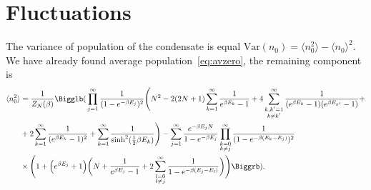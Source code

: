 \documentclass[aps,pra,reprint]{revtex4-2}
\begin{document}
\section{Fluctuations}
The variance of population of the condensate is equal 
$\text{Var}(n_0)=\langle n_0^2 \rangle -\langle n_0 \rangle ^2$. We have 
already found average population~\eqref{eq:avzero}, the remaining component is
\begin{equation}
\begin{split}
\langle n_0 ^2 \rangle &= \frac{1}{Z_N(\beta)} \Bigglb ( \,\prod_{j=1}^{\infty} 
\frac{1}{(1-e^{-\beta E_j})^2} \Bigg(N^2 - 2 (2N+1)\sum_{k=1}^{\infty} 
\frac{1}{e^{\beta E_k}-1} + 4\sum_{\substack{k,k'=1 \\k \neq k'}}^{\infty} 
\frac{1}{(e^{\beta E_k}-1)(e^{\beta E_{k'}}-1)} + \\ 
& + 2\sum_{k=1}^{\infty} \frac{1}{(e^{\beta E_k}-1)^2} + 
\sum_{k=1}^{\infty} \frac{1}{\text{sinh}^2(\frac{1}{2} \beta E_k)} \Bigg) - 
\sum_{j=1}^{\infty} \frac{e^{-\beta E_j N}}{1-e^{-\beta E_j}} 
\prod_{\substack{k=0 \\ k \neq j}}^{\infty} \frac{1}{(1-e^{-\beta(E_k-E_j)})^2} 
\\ 
& \times \Bigg(1 + \Big(e^{\beta E_j}+1\Big) \bigg(N + 
\frac{1}{e^{\beta E_j}-1} + 2\sum_{\substack{l=0 \\ l \neq j}}^{\infty} 
\frac{1}{1-e^{-\beta(E_j-E_l)}} \bigg) \Bigg) \Biggrb ).
\end{split}
\end{equation}

\twocolumngrid

\end{document}

